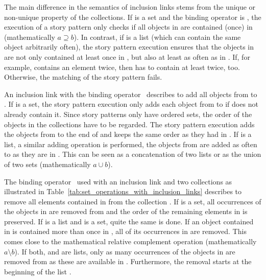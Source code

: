 The main difference in the semantics of inclusion links stems from the unique or non-unique property of the collections.
If  is a set and the binding operator is , the execution of a story pattern
only checks if all objects in  are contained (once) in 
(mathematically $a \supseteq b$).
In contrast, if  is a list (which can contain the same object arbitrarily often),
the story pattern execution ensures that the objects in  are not only contained at least once in ,
but also at least as often as in .
If, for example,  contains an element  twice, then  has to contain  at least twice, too.
Otherwise, the matching of the story pattern fails.

An inclusion link with the binding operator \create\ describes to add all objects from  to .
If  is a set, the story pattern execution only adds each object from  to 
if  does not already contain it. %
Since story patterns only have ordered sets, the order of the objects in the collections have to be regarded.
The story pattern execution adds the objects from  to the end of  and keeps the same order as they had in .
If  is a list, a similar adding operation is performed,
the objects from  are added as often to  as they are in .
This can be seen as a concatenation of two lists or as the union of two sets (mathematically $a \cup b$).

The binding operator \destroy\ used with an inclusion link and two collections as illustrated in Table~\ref{tab:set_operations_with_inclusion_links}
describes to remove all elements contained in  from the collection .
If  is a set, all occurrences of the objects in  are removed from  and the order of the remaining elements in  is preserved.
If  is a list and  is a set, quite the same is done.
If an object contained in  is contained more than once in , all of its occurrences in  are removed.
This comes close to the mathematical relative complement operation (mathematically $a \setminus b$).
If both,  and  are lists,
only as many occurrences of the objects in  are removed from  as these are available in .
Furthermore, the removal starts at the beginning of the list .

